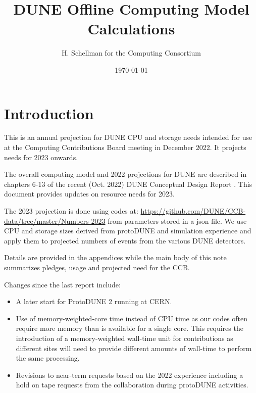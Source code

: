 \documentclass[12pt]{article}
\title{DUNE Offline Computing Model Calculations}
\author{H. Schellman for the Computing Consortium}
\date{\today}
\begin{document}
\makeatletter
{}
\makeatother
\newcommand{\csvautotabularright}[2][]{\csvloop{autotabularright={#2},#1}}

\maketitle
\section{Introduction}

This is an annual projection for DUNE CPU and storage needs intended for use at the Computing Contributions Board meeting in December 2022. It projects needs for 2023 onwards. 

The overall computing model  and 2022 projections for DUNE are described in chapters 6-13 of the recent (Oct. 2022) DUNE Conceptual Design Report \cite{DUNE:2022fcw}.   This document provides updates on resource needs for 2023. 

The 2023 projection is done using codes at: \href{https://github.com/DUNE/CCB-data/tree/master/Numbers-2023}{https://github.com/DUNE/CCB-data/tree/master/Numbers-2023} from parameters stored in a json file. We use CPU and storage sizes derived from protoDUNE and simulation experience and apply them to projected numbers of events from the various DUNE detectors. 

Details are provided in the appendices while the main body of this note summarizes pledges, usage and projected need for the CCB.

Changes since the last report include:

\begin{itemize}
\item A later start for ProtoDUNE 2 running at CERN.
\item Use of memory-weighted-core time instead of CPU time as our codes often require more memory than is available for a single core.   This requires the introduction of a memory-weighted wall-time unit for contributions  as different sites will  need to provide different amounts of wall-time to perform the same processing. 
\item Revisions to near-term requests based on the 2022 experience including a hold on tape requests from the collaboration during protoDUNE activities. 
\end{itemize}
\clearpage
\end{document}
